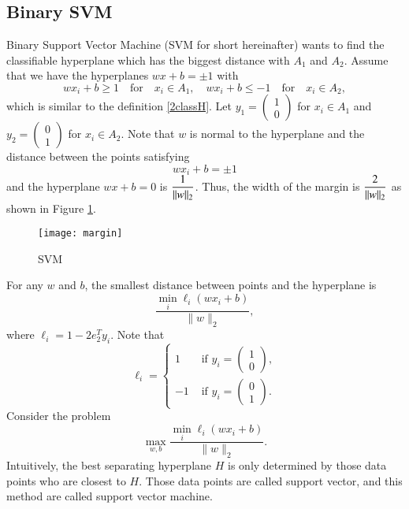\subsection{Binary SVM}\label{sec:SVM}
Binary Support Vector Machine (SVM for short hereinafter) wants to find the classifiable hyperplane which has the biggest distance with $A_1$ and $A_2$. Assume that we have the hyperplanes $wx+b=\pm 1$ with
$$
wx_i+b\ge 1 \quad \mbox{for}\quad x_i\in A_1,\quad wx_i+b\le -1 \quad \mbox{for}\quad x_i\in A_2,
$$
which is similar to the definition \eqref{2classH}.
Let $y_1=\begin{pmatrix}1\\0\end{pmatrix}$ for $x_i\in A_1$ and $y_2=\begin{pmatrix}0\\1\end{pmatrix}$ for $x_i\in A_2$. %
Note that $w$ is normal to the hyperplane and the distance  between the points satisfying 
$$
wx_i+b=\pm 1
$$
and the hyperplane $wx+b=0$ is $\displaystyle {1\over \|w\|_2}$. Thus, the width of the margin is $\displaystyle {2\over \|w\|_2}$ as shown in Figure \ref{fig:margin}.
\begin{figure}
	\centering
	\texttt{[image: margin]}
	\caption{SVM}
	\label{fig:margin}
\end{figure}
For any $w$ and $b$, the smallest distance between points and the hyperplane is 
\begin{equation}
\frac{\min_{i} \ell_i(wx_i+b)}{\|w\|_2},
\end{equation} 
where $\ell_i=1-2e_2^Ty_i$.
Note that 
$$
\ell_i=\begin{cases}
1 & \mbox{ if } y_i=\begin{pmatrix}1\\0\end{pmatrix},
\\
-1 &\mbox{ if } y_i=\begin{pmatrix}0\\1\end{pmatrix}.
\end{cases}
$$
Consider the problem
\begin{equation}
	\max_{w,b} \frac{\min_{i} \ell_i(wx_i+b)}{\|w\|_2}.
\end{equation}
Intuitively, the best separating hyperplane $H$ is only determined by those data points who are closest to $H$. Those data points are called {support vector}, and this method are called {support vector machine}.

